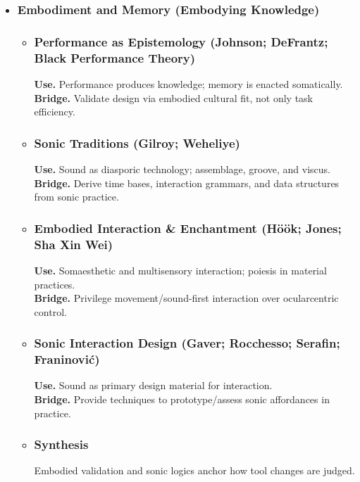 \begin{itemize}[nosep]
\begin{itemize}[nosep]
	\end{itemize}
	\item \subsubsection{Embodiment and Memory (Embodying Knowledge)}
	\begin{itemize}[nosep]
		\item \subsubsection{Performance as Epistemology (Johnson; DeFrantz; Black Performance Theory)}
		\textbf{Use.} Performance produces knowledge; memory is enacted somatically. \\
		\textbf{Bridge.} Validate design via embodied cultural fit, not only task efficiency.
		\item \subsubsection{Sonic Traditions (Gilroy; Weheliye)}
		\textbf{Use.} Sound as diasporic technology; assemblage, groove, and viscus. \\
		\textbf{Bridge.} Derive time bases, interaction grammars, and data structures from sonic practice.
		\item \subsubsection{Embodied Interaction \& Enchantment (Höök; Jones; Sha Xin Wei)}
		\textbf{Use.} Somaesthetic and multisensory interaction; poiesis in material practices. \\
		\textbf{Bridge.} Privilege movement/sound-first interaction over ocularcentric control.
		\item \subsubsection{Sonic Interaction Design (Gaver; Rocchesso; Serafin; Franinović)}
		\textbf{Use.} Sound as primary design material for interaction. \\
		\textbf{Bridge.} Provide techniques to prototype/assess sonic affordances in practice.
		\item \subsubsection{Synthesis} Embodied validation and sonic logics anchor how tool changes are judged.

\end{itemize}
\end{itemize}
